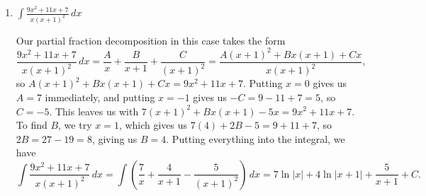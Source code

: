 \documentclass[12pt]{article}
\newcommand{\di}{\displaystyle}
\newcommand{\abs}[1]{\lvert #1\rvert}
\begin{document}
\begin{enumerate}
   \item $\di \int \frac{9x^2+11x+7}{x(x+1)^2}\,dx$
   
   \medskip
   
   Our partial fraction decomposition in this case takes the form
\[
 \frac{9x^2+11x+7}{x(x+1)^2}\,dx = \frac{A}{x}+\frac{B}{x+1}+\frac{C}{(x+1)^2} = \frac{A(x+1)^2+Bx(x+1)+Cx}{x(x+1)^2},
\]
so $A(x+1)^2+Bx(x+1)+Cx = 9x^2+11x+7$. Putting $x=0$ gives us $A=7$ immediately, and putting $x=-1$ gives us $-C=9-11+7=5$, so $C=-5$. This leaves us with $7(x+1)^2+Bx(x+1)-5x=9x^2+11x+7$. To find $B$, we try $x=1$, which gives us $7(4)+2B-5=9+11+7$, so $2B = 27-19 = 8$, giving us $B=4$. Putting everything into the integral, we have
\[
 \int\frac{9x^2+11x+7}{x(x+1)^2}\,dx = \int\left(\frac{7}{x}+\frac{4}{x+1}-\frac{5}{(x+1)^2}\right)\,dx = 7\ln\abs{x}+4\ln\abs{x+1}+\frac{5}{x+1}+C.
\]


\end{enumerate}  

\newpage
\end{document}
